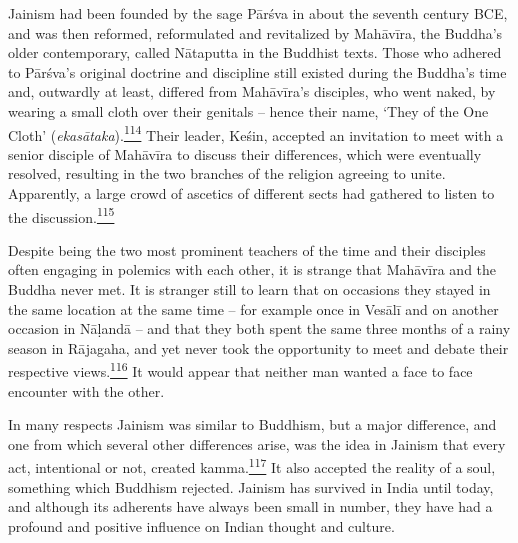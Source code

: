 Jainism had been founded by the sage Pārśva in about the seventh century
BCE, and was then reformed, reformulated and revitalized by Mahāvīra,
the Buddha's older contemporary, called Nātaputta in the Buddhist texts.
Those who adhered to Pārśva's original doctrine and discipline still
existed during the Buddha's time and, outwardly at least, differed from
Mahāvīra's disciples, who went naked, by wearing a small cloth over
their genitals -- hence their name, `They of the One Cloth'
(\emph{ekasātaka}).\label{footprints_split_007.html_fnref114}\hyperref[footprints_split_024.htmlux5cux23fn114]{\textsuperscript{114}}
Their leader, Keśin, accepted an invitation to meet with a senior
disciple of Mahāvīra to discuss their differences, which were eventually
resolved, resulting in the two branches of the religion agreeing to
unite. Apparently, a large crowd of ascetics of different sects had
gathered to listen to the
discussion.\label{footprints_split_007.html_fnref115}\hyperref[footprints_split_024.htmlux5cux23fn115]{\textsuperscript{115}}

Despite being the two most prominent teachers of the time and their
disciples often engaging in polemics with each other, it is strange that
Mahāvīra and the Buddha never met. It is stranger still to learn that on
occasions they stayed in the same location at the same time -- for
example once in Vesālī and on another occasion in Nāḷandā -- and that
they both spent the same three months of a rainy season in Rājagaha, and
yet never took the opportunity to meet and debate their respective
views.\label{footprints_split_007.html_fnref116}\hyperref[footprints_split_024.htmlux5cux23fn116]{\textsuperscript{116}}
It would appear that neither man wanted a face to face encounter with
the other.

In many respects Jainism was similar to Buddhism, but a major
difference, and one from which several other differences arise, was the
idea in Jainism that every act, intentional or not, created
kamma.\label{footprints_split_007.html_fnref117}\hyperref[footprints_split_024.htmlux5cux23fn117]{\textsuperscript{117}}
It also accepted the reality of a soul, something which Buddhism
rejected. Jainism has survived in India until today, and although its
adherents have always been small in number, they have had a profound and
positive influence on Indian thought and culture.


